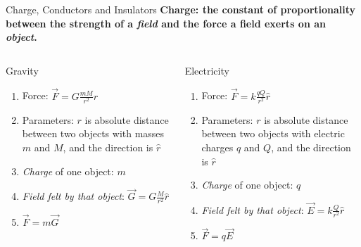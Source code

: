 \documentclass{beamer}
\begin{document}
\begin{frame}{Charge, Conductors and Insulators}
\centering
\textbf{\alert{Charge: the constant of proportionality between the strength of a \textit{field} and the force a field exerts on an \textit{object}.}} \\
\hrulefill
\small
\begin{columns}[T]
\begin{column}{0.5\textwidth}
\alert{Gravity}
\begin{enumerate}
\item Force: $\vec{F} = G \frac{m M}{r^2} \hat{r}$
\item Parameters: $r$ is absolute distance between two objects with masses $m$ and $M$, and the direction is $\hat{r}$
\item \textit{Charge} of one object: $m$
\item \textit{Field felt by that object}: $\vec{G} = G \frac{M}{r^2} \hat{r}$
\item $\vec{F} = m \vec{G}$
\end{enumerate}
\end{column}
\begin{column}{0.5\textwidth}
\alert{Electricity}
\begin{enumerate}
\item Force: $\vec{F} = k \frac{q Q}{r^2} \hat{r}$
\item Parameters: $r$ is absolute distance between two objects with electric charges $q$ and $Q$, and the direction is $\hat{r}$
\item \textit{Charge} of one object: $q$
\item \textit{Field felt by that object}: $\vec{E} = k \frac{Q}{r^2} \hat{r}$
\item $\vec{F} = q \vec{E}$
\end{enumerate}
\end{column}
\end{columns}
\end{frame}
\end{document}
